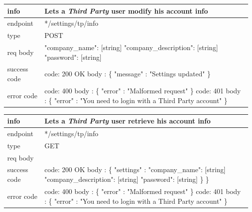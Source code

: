 \documentclass[titlepage]{article}
\begin{document}
	\vspace{\baselineskip}
	
	\begin{tabularx}{\textwidth}{lX} \hline
		info & Lets a {\it Third Party} user modify his account info \\ \hline
		endpoint & */settings/tp/info \\ \hline
		type & POST \\ \hline
		req body & 
		"company\_name": [string] \newline
		"company\_description": [string] \newline
		"password": [string] \\ \hline
		success code &
		code: 200 OK \newline  
		body : \{ \newline
		"message" : "Settings updated" \newline
		\} \\ \hline
		error code &
		code: 400 \newline
		body : \{ "error" : "Malformed request" \} \newline \newline
		code: 401 \newline
		body : \{ "error" : "You need to login with a Third Party account" \} \\ \hline
	\end{tabularx}
	
	\vspace{\baselineskip}
	
	\begin{tabularx}{\textwidth}{lX} \hline
		info & Lets a {\it Third Party} user retrieve his account info \\ \hline
		endpoint & */settings/tp/info \\ \hline
		type & GET \\ \hline
		req body & \\ \hline
		success code &
		code: 200 OK \newline  
		body : \{ \newline
		"settings" : \newline
		"company\_name": [string] \newline
		"company\_description": [string] \newline
		"password": [string]  \newline
		\} \newline
		\} \\ \hline
		error code &
		code: 400 \newline
		body : \{ "error" : "Malformed request" \} \newline \newline
		code: 401 \newline
		body : \{ "error" : "You need to login with a Third Party account" \} \\ \hline
	\end{tabularx}
	
\end{document}
